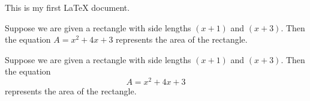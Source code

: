 \documentclass[11pt]{article}
\begin{document}
This is my first LaTeX document.

Suppose we are given a rectangle with side
lengths $(x+1)$ and $(x+3)$. Then the equation 
$A=x^2+4x+3$ represents the area of the rectangle.

Suppose we are given a rectangle with side
lengths $(x+1)$ and $(x+3)$. Then the equation 
$$A=x^2+4x+3$$ represents the area of the rectangle.
\end{document}
